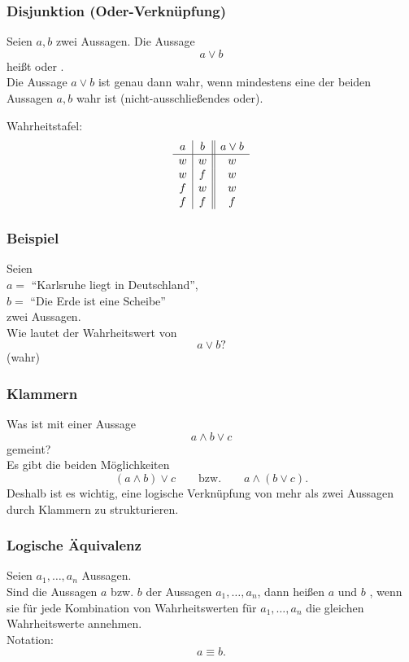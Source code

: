 \begin{frame}\frametitle{Disjunktion (Oder-Verknüpfung)}

	Seien $a, b$ zwei Aussagen. Die Aussage
	$$
		a \lor b
	$$
	heißt  oder . \\[1mm]
	
	Die Aussage $a \lor b$ ist genau dann wahr, wenn mindestens eine der beiden Aussagen $a, b$ wahr ist 
	(nicht-ausschließendes oder).

	\vfill
	Wahrheitstafel:
	$$
		\begin{array}{c | c || c}
			a	& b	& a\lor b	\\ \hline
			w	& w	& w		\\
			w	& f	& w		\\
			f	& w	& w		\\
			f	& f	& f	
		\end{array}
	$$
	
\end{frame}
%
%
\begin{frame}\frametitle{Beispiel}
	
	Seien \\
	$a = $ ``Karlsruhe liegt in Deutschland'',\\
	$b = $ ``Die Erde ist eine Scheibe''\\
	 zwei Aussagen.\\[2mm]
	 
	 Wie lautet der Wahrheitswert von 
	 $$
	 	a\lor b?
	 $$
	 \pause
	 (wahr)
	
\end{frame}
%
%
\begin{frame}\frametitle{Klammern}
	
	Was ist mit einer Aussage
	$$
		a\land b \lor c
	$$
	gemeint?\\ 
	\pause
	Es gibt die beiden Möglichkeiten
	$$
		(a\land b) \lor c\qquad\text{bzw.}\qquad a \land (b\lor c).
	$$
	Deshalb ist es wichtig, eine logische Verknüpfung von mehr als zwei Aussagen durch Klammern zu strukturieren.
	
\end{frame}
%
%
\begin{frame}\frametitle{Logische Äquivalenz}
	
	Seien $a_1,\ldots, a_n$ Aussagen.\\[1mm]
	
	Sind die Aussagen $a$ bzw. $b$  der Aussagen $a_1, \ldots, a_n$,
	dann heißen  $a$ und $b$  , wenn sie für jede Kombination von Wahrheitswerten 
	für $a_1, \ldots, a_n$ die gleichen Wahrheitswerte annehmen.\\[2mm]
	
	Notation: 
	$$
		a \equiv b.
	$$
	
	
\end{frame}
